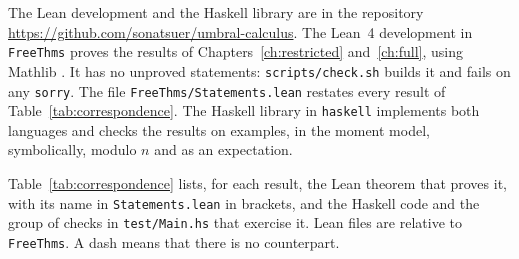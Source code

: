 \documentclass[11pt,a4paper]{report}
\theoremstyle{plain}
\theoremstyle{definition}
\theoremstyle{remark}
\begin{document}
The Lean development and the Haskell library are in the repository
\url{https://github.com/sonatsuer/umbral-calculus}. The Lean~4 development in
\texttt{FreeThms} proves the results of
Chapters~\ref{ch:restricted} and~\ref{ch:full}, using Mathlib \cite{Mathlib}. It
has no unproved statements: \texttt{scripts/check.sh} builds it and fails on any
\texttt{sorry}. The file \texttt{FreeThms/Statements.lean} restates every result
of Table~\ref{tab:correspondence}. The Haskell library in \texttt{haskell}
implements both languages and checks the results on examples, in the moment
model, symbolically, modulo $n$ and as an expectation.

Table~\ref{tab:correspondence} lists, for each result, the Lean theorem that
proves it, with its name in \texttt{Statements.lean} in brackets, and the Haskell
code and the group of checks in \texttt{test/Main.hs} that exercise it. Lean
files are relative to \texttt{FreeThms}. A dash means that there is no
counterpart.
\end{document}

